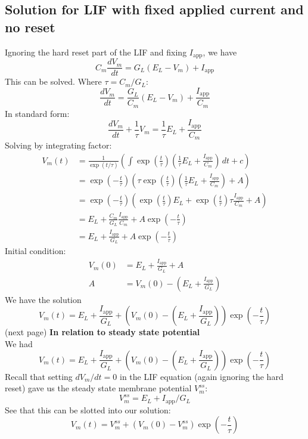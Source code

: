 \documentclass{report}
\begin{document}
\subsection{Solution for LIF with fixed applied current and no reset}
Ignoring the hard reset part of the LIF and fixing $I_{\text{app}}$, we have
\begin{equation*}
C_m\frac{dV_m}{dt}=G_L(E_L-V_m)+I_\text{app}
\end{equation*}
This can be solved. Where $\tau=C_m/G_L$:
\begin{equation*}
\frac{dV_m}{dt}=\frac{G_L}{C_m}(E_L-V_m)+\frac{I_\text{app}}{C_m}
\end{equation*}
In standard form:
\begin{equation*}
\frac{dV_m}{dt}+\frac{1}{\tau}V_m=\frac{1}{\tau}E_L+\frac{I_\text{app}}{C_m}
\end{equation*}
Solving by integrating factor:
\begin{align*}
V_m(t)&=\frac{1}{\exp(t/\tau)}\left(\int\exp\left(\frac{t}{\tau}\right)\left(\frac{1}{\tau}E_L+\frac{I_\text{app}}{C_m}\right)\,dt+c\right)\\
&=\exp\left(-\frac{t}{\tau}\right)\left(\tau\exp\left(\frac{t}{\tau}\right)\left(\frac{1}{\tau}E_L+\frac{I_\text{app}}{C_m}\right)+A\right)\\
&=\exp\left(-\frac{t}{\tau}\right)\left(\exp\left(\frac{t}{\tau}\right)E_L+\exp\left(\frac{t}{\tau}\right)\tau\frac{I_\text{app}}{C_m}+A\right)\\
&=E_L+\frac{C_m}{G_L}\frac{I_\text{app}}{C_m}+A\exp\left(-\frac{t}{\tau}\right)\\
&=E_L+\frac{I_\text{app}}{G_L}+A\exp\left(-\frac{t}{\tau}\right)
\end{align*}
Initial condition:
\begin{align*}
V_m(0)&=E_L+\frac{I_\text{app}}{G_L}+A\\
A&=V_m(0)-\left(E_L+\frac{I_\text{app}}{G_L}\right)
\end{align*}
We have the solution
\begin{equation*}
V_m(t)=E_L+\frac{I_\text{app}}{G_L}+\left(V_m(0)-\left(E_L+\frac{I_\text{app}}{G_L}\right)\right)\exp\left(-\frac{t}{\tau}\right)
\end{equation*}
(next page)
\newpage
\noindent\textbf{In relation to steady state potential}\\
We had
\begin{equation*}
V_m(t)=E_L+\frac{I_\text{app}}{G_L}+\left(V_m(0)-\left(E_L+\frac{I_\text{app}}{G_L}\right)\right)\exp\left(-\frac{t}{\tau}\right)
\end{equation*}
Recall that setting $dV_m/dt=0$ in the LIF equation (again ignoring the hard reset) gave us the steady state membrane potential $V^{ss}_m$:
\begin{equation*}
V^{ss}_m=E_L+I_{\text{app}}/G_L
\end{equation*}
See that this can be slotted into our solution:
\begin{equation*}
V_m(t)=V^{ss}_m+\left(V_m(0)-V^{ss}_m\right)\exp\left(-\frac{t}{\tau}\right)
\end{equation*}
\newpage
\end{document}
